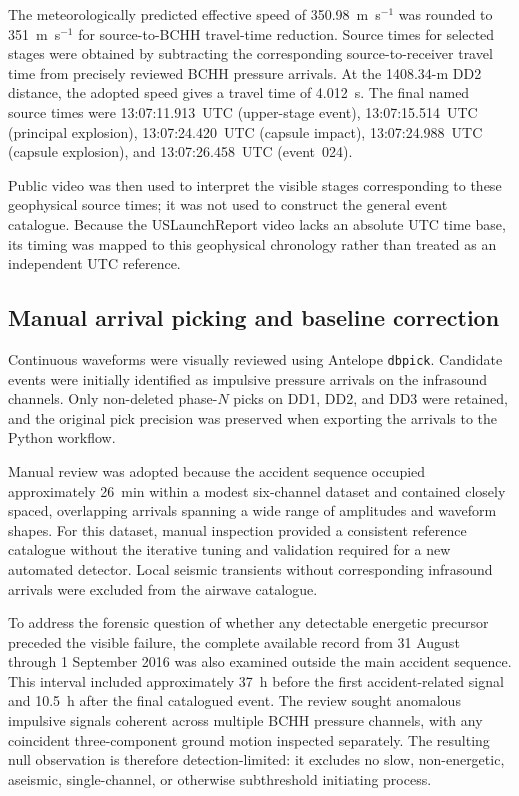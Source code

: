 \documentclass[]{seismica}
\begin{document}
The meteorologically predicted effective speed of 350.98~m~s$^{-1}$ was
rounded to 351~m~s$^{-1}$ for source-to-BCHH travel-time reduction. Source
times for selected stages were obtained by subtracting the corresponding
source-to-receiver travel time from precisely reviewed BCHH pressure arrivals.
At the 1408.34-m DD2 distance, the adopted speed gives a travel time of
4.012~s. The final named source times were 13:07:11.913~UTC (upper-stage event),
13:07:15.514~UTC (principal explosion), 13:07:24.420~UTC (capsule impact),
13:07:24.988~UTC (capsule explosion), and 13:07:26.458~UTC (event~024).

Public video was then used to interpret the visible stages corresponding to
these geophysical source times; it was not used to construct the general event
catalogue. Because the USLaunchReport video lacks an absolute UTC time base,
its timing was mapped to this geophysical chronology rather than treated as an
independent UTC reference.

\subsection{Manual arrival picking and baseline correction}

Continuous waveforms were visually reviewed using Antelope \texttt{dbpick}. Candidate events were initially identified as impulsive pressure arrivals on the infrasound channels. Only non-deleted phase-$N$ picks on DD1, DD2, and DD3 were retained, and the original pick precision was preserved when exporting the arrivals to the Python workflow.

Manual review was adopted because the accident sequence occupied approximately 26~min within a modest six-channel dataset and contained closely spaced, overlapping arrivals spanning a wide range of amplitudes and waveform shapes. For this dataset, manual inspection provided a consistent reference catalogue without the iterative tuning and validation required for a new automated detector. Local seismic transients without corresponding infrasound arrivals were excluded from the airwave catalogue.

To address the forensic question of whether any detectable energetic precursor
preceded the visible failure, the complete available record from 31 August
through 1 September 2016 was also examined outside the main accident sequence.
This interval included approximately 37~h before the first accident-related
signal and 10.5~h after the final catalogued event. The review sought anomalous
impulsive signals coherent across multiple BCHH pressure channels, with any
coincident three-component ground motion inspected separately. The resulting
null observation is therefore detection-limited: it excludes no slow,
non-energetic, aseismic, single-channel, or otherwise subthreshold initiating
process.
\end{document}

